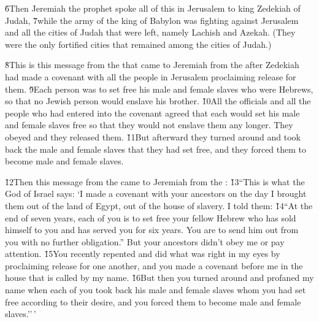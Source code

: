 \v{6}Then Jeremiah the prophet spoke all of this in Jerusalem to king Zedekiah of Judah, \v{7}while the army of the king of Babylon was fighting against Jerusalem and all the cities of Judah that were left, namely Lachish and Azekah. (They were the only fortified cities that remained among the cities of Judah.)

\v{8}This is this message from the  that came to Jeremiah from the  after Zedekiah had made a covenant with all the people in Jerusalem proclaiming release for them. \v{9}Each person was to set free his male and female slaves who were Hebrews, so that no Jewish person would enslave his brother. \v{10}All the officials and all the people who had entered into the covenant agreed that each would set his male and female slaves free so that they would not enslave them any longer. They obeyed and they released them. \v{11}But afterward they turned around and took back the male and female slaves that they had set free, and they forced them to become male and female slaves.

\v{12}Then this message from the  came to Jeremiah from the : \v{13}``This is what the  God of Israel says: `I made a covenant with your ancestors on the day I brought them out of the land of Egypt, out of the house of slavery. I told them: \v{14}``At the end of seven years, each of you is to set free your fellow Hebrew who has sold himself to you and has served you for six years. You are to send him out from you with no further obligation.'' But your ancestors didn't obey me or pay attention. \v{15}You recently repented and did what was right in my eyes by proclaiming release for one another, and you made a covenant before me in the house that is called by my name. \v{16}But then you turned around and profaned my name when each of you took back his male and female slaves whom you had set free according to their desire, and you forced them to become male and female slaves.''\,'

